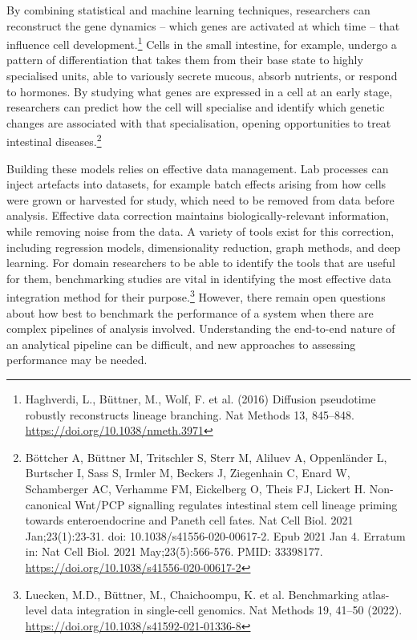 {By combining statistical and machine learning techniques, researchers
can reconstruct the gene dynamics -- which genes are activated at which
time -- that influence cell development.\footnote{Haghverdi, L.,
  Büttner, M., Wolf, F. et al. (2016) Diffusion pseudotime robustly
  reconstructs lineage branching. Nat Methods 13, 845--848.
  \href{https://doi.org/10.1038/nmeth.3971}{\uline{https://doi.org/10.1038/nmeth.3971}}}
Cells in the small intestine, for example, undergo a pattern of
differentiation that takes them from their base state to highly
specialised units, able to variously secrete mucous, absorb nutrients,
or respond to hormones. By studying what genes are expressed in a cell
at an early stage, researchers can predict how the cell will specialise
and identify which genetic changes are associated with that
specialisation, opening opportunities to treat intestinal
diseases.\footnote{Böttcher A, Büttner M, Tritschler S, Sterr M, Aliluev
  A, Oppenländer L, Burtscher I, Sass S, Irmler M, Beckers J, Ziegenhain
  C, Enard W, Schamberger AC, Verhamme FM, Eickelberg O, Theis FJ,
  Lickert H. Non-canonical Wnt/PCP signalling regulates intestinal stem
  cell lineage priming towards enteroendocrine and Paneth cell fates.
  Nat Cell Biol. 2021 Jan;23(1):23-31. doi: 10.1038/s41556-020-00617-2.
  Epub 2021 Jan 4. Erratum in: Nat Cell Biol. 2021 May;23(5):566-576.
  PMID: 33398177. \url{https://doi.org/10.1038/s41556-020-00617-2}}

Building these models relies on effective data management. Lab processes
can inject artefacts into datasets, for example batch effects arising
from how cells were grown or harvested for study, which need to be
removed from data before analysis. Effective data correction maintains
biologically-relevant information, while removing noise from the data. A
variety of tools exist for this correction, including regression models,
dimensionality reduction, graph methods, and deep learning. For domain
researchers to be able to identify the tools that are useful for them,
benchmarking studies are vital in identifying the most effective data
integration method for their purpose.\footnote{Luecken, M.D., Büttner,
  M., Chaichoompu, K. et al. Benchmarking atlas-level data integration
  in single-cell genomics. Nat Methods 19, 41--50 (2022).
  \href{https://doi.org/10.1038/s41592-021-01336-8}{\uline{https://doi.org/10.1038/s41592-021-01336-8}}}
However, there remain open questions about how best to benchmark the
performance of a system when there are complex pipelines of analysis
involved. Understanding the end-to-end nature of an analytical pipeline
can be difficult, and new approaches to assessing performance may be
needed.

}
